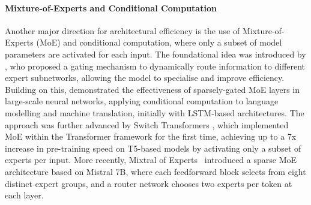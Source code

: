 \paragraph{Mixture-of-Experts and Conditional Computation}
Another major direction for architectural efficiency is the use of Mixture-of-Experts (MoE) and conditional computation, where only a subset of model parameters are activated for each input. The foundational idea was introduced by \citet{jacobs1991adaptive}, who proposed a gating mechanism to dynamically route information to different expert subnetworks, allowing the model to specialise and improve efficiency. Building on this, \citet{shazeer2017outrageously} demonstrated the effectiveness of sparsely-gated MoE layers in large-scale neural networks, applying conditional computation to language modelling and machine translation, initially with LSTM-based architectures. The approach was further advanced by Switch Transformers \citep{fedus2021switch}, which implemented MoE within the Transformer framework for the first time, achieving up to a 7x increase in pre-training speed on T5-based models by activating only a subset of experts per input. More recently, Mixtral of Experts~ \citep{jiang2024mixtral} introduced a sparse MoE architecture based on Mistral 7B, where each feedforward block selects from eight distinct expert groups, and a router network chooses two experts per token at each layer. %

